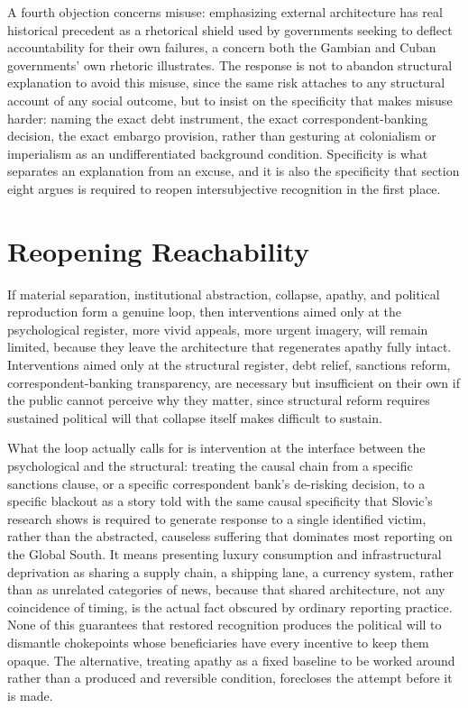 \documentclass[11pt]{article}
\begin{document}
A fourth objection concerns misuse: emphasizing external architecture has real historical precedent as a rhetorical shield used by governments seeking to deflect accountability for their own failures, a concern both the Gambian and Cuban governments' own rhetoric illustrates. The response is not to abandon structural explanation to avoid this misuse, since the same risk attaches to any structural account of any social outcome, but to insist on the specificity that makes misuse harder: naming the exact debt instrument, the exact correspondent-banking decision, the exact embargo provision, rather than gesturing at colonialism or imperialism as an undifferentiated background condition. Specificity is what separates an explanation from an excuse, and it is also the specificity that section eight argues is required to reopen intersubjective recognition in the first place.

\section{Reopening Reachability}

If material separation, institutional abstraction, collapse, apathy, and political reproduction form a genuine loop, then interventions aimed only at the psychological register, more vivid appeals, more urgent imagery, will remain limited, because they leave the architecture that regenerates apathy fully intact. Interventions aimed only at the structural register, debt relief, sanctions reform, correspondent-banking transparency, are necessary but insufficient on their own if the public cannot perceive why they matter, since structural reform requires sustained political will that collapse itself makes difficult to sustain.

What the loop actually calls for is intervention at the interface between the psychological and the structural: treating the causal chain from a specific sanctions clause, or a specific correspondent bank's de-risking decision, to a specific blackout as a story told with the same causal specificity that Slovic's research shows is required to generate response to a single identified victim, rather than the abstracted, causeless suffering that dominates most reporting on the Global South. It means presenting luxury consumption and infrastructural deprivation as sharing a supply chain, a shipping lane, a currency system, rather than as unrelated categories of news, because that shared architecture, not any coincidence of timing, is the actual fact obscured by ordinary reporting practice. None of this guarantees that restored recognition produces the political will to dismantle chokepoints whose beneficiaries have every incentive to keep them opaque. The alternative, treating apathy as a fixed baseline to be worked around rather than a produced and reversible condition, forecloses the attempt before it is made.
\end{document}
